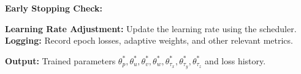 \documentclass[12pt, a4paper]{article}
\begin{document}
\begin{algorithm}[H]
\begin{algorithmic}[1]
    \State \textbf{Early Stopping Check:}
    
    \State \textbf{Learning Rate Adjustment:} Update the learning rate using the scheduler.
    \State \textbf{Logging:} Record epoch losses, adaptive weights, and other relevant metrics.
\EndFor

\State \textbf{Output:} Trained parameters $\theta_p^*, \theta_u^*, \theta_v^*, \theta_w^*, \theta_{\tau_x}^*, \theta_{\tau_y}^*, \theta_{\tau_z}^*$ and loss history.

\end{algorithmic}
\end{algorithm}
\end{document}
